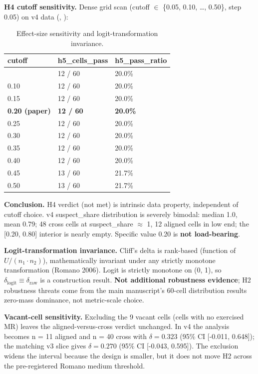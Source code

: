 \documentclass[manuscript,screen,review]{acmart}
\begin{document}
\textbf{H4 cutoff sensitivity.} Dense grid scan (cutoff
$\in$ \{0.05, 0.10, \ldots, 0.50\}, step 0.05) on v4 data
(,
):

{%
\begin{longtable}[]{@{}lll@{}}
\caption{Effect-size sensitivity and logit-transformation invariance.}\label{tab:p2-22}\\
\toprule\noalign{}
cutoff & h5\_cells\_pass & h5\_pass\_ratio \\
\midrule\noalign{}
\endfirsthead
\endhead
\bottomrule\noalign{}
\endlastfoot
0.05 & 12 / 60 & 20.0\% \\
0.10 & 12 / 60 & 20.0\% \\
0.15 & 12 / 60 & 20.0\% \\
\textbf{0.20 (paper)} & \textbf{12 / 60} & \textbf{20.0\%} \\
0.25 & 12 / 60 & 20.0\% \\
0.30 & 12 / 60 & 20.0\% \\
0.35 & 12 / 60 & 20.0\% \\
0.40 & 12 / 60 & 20.0\% \\
0.45 & 13 / 60 & 21.7\% \\
0.50 & 13 / 60 & 21.7\% \\
\end{longtable}
}

\textbf{Conclusion.} H4 verdict (not met) is intrinsic data property,
independent of cutoff choice. v4 suspect\_share distribution is severely
bimodal: median 1.0, mean 0.79; 48 cross cells at suspect\_share $\approx$ 1, 12
aligned cells in low end; the {[}0.20, 0.80{]} interior is nearly empty.
Specific value 0.20 is \textbf{not load-bearing}.

\textbf{Logit-transformation invariance.} Cliff's delta is rank-based
(function of $U / (n_1 \cdot n_2)$), mathematically invariant under any strictly
monotone transformation (Romano 2006). Logit is strictly monotone on (0,
1), so $\delta_{\mathrm{logit}} \equiv \delta_{\mathrm{raw}}$ is a construction result. \textbf{Not
additional robustness evidence}; H2 robustness threats come from the main manuscript's 60-cell distribution results
zero-mass dominance, not metric-scale choice.

\textbf{Vacant-cell sensitivity.} Excluding the 9 vacant cells (cells
with no exercised MR) leaves the aligned-versus-cross verdict unchanged.
In v4 the analysis becomes n = 11 aligned and n = 40 cross with
$\delta = 0.323$ (95\% CI [-0.011, 0.648]); the matching v3 slice gives
$\delta = 0.270$ (95\% CI [-0.043, 0.595]). The exclusion widens the
interval because the design is smaller, but it does not move H2 across
the pre-registered Romano medium threshold.
\end{document}
